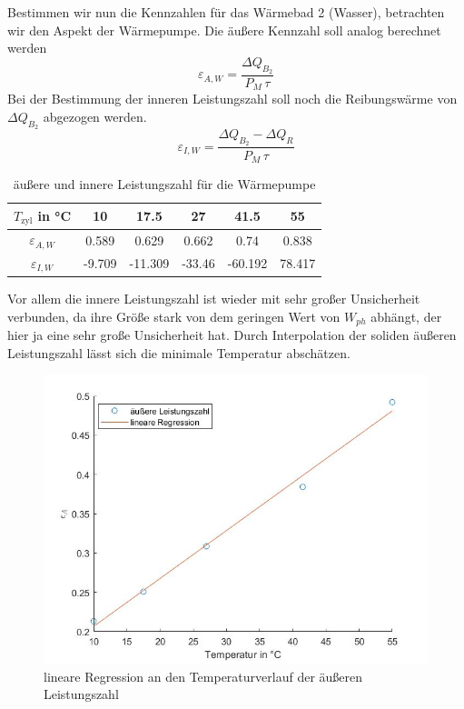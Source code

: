 \documentclass[a4paper, 12pt,]{scrartcl}
\begin{document}
Bestimmen wir nun die Kennzahlen für das Wärmebad 2 (Wasser), betrachten wir den Aspekt der Wärmepumpe. Die äußere Kennzahl soll analog berechnet werden
\begin{equation*}\varepsilon_{A,W}=\frac{\Delta{Q_{B_2}}}{P_M\,\tau}\end{equation*}
Bei der Bestimmung der inneren Leistungszahl soll noch die Reibungswärme von$\Delta{Q_{B_2}}$ abgezogen werden.
\begin{equation*}\varepsilon_{I,W}=\frac{\Delta{Q_{B_2}}-\Delta{Q_R}}{P_M\,\tau}\end{equation*}
\begin{table}[H]\centering\begin{tabular}{c|ccccc}
$T_\text{zyl}$ in °C&10&17.5&27&41.5&55\\\hline
$\varepsilon_{A,W}$&0.589	&0.629	&0.662	&0.74	&0.838\\
$\varepsilon_{I,W}$&-9.709	&-11.309	&-33.46	&-60.192	&78.417\end{tabular}
\caption{äußere und innere Leistungszahl für die Wärmepumpe}\end{table}
Vor allem die innere Leistungszahl ist wieder mit sehr großer Unsicherheit verbunden, da ihre Größe stark von dem geringen Wert von $W_{ph}$ abhängt, der hier ja eine sehr große Unsicherheit hat.
Durch Interpolation der soliden äußeren Leistungszahl lässt sich die minimale Temperatur abschätzen.
\begin{figure}[H]\centering\includegraphics[scale=0.6]{Tempappro}\caption{lineare Regression an den Temperaturverlauf der äußeren Leistungszahl}\end{figure}
\end{document}
